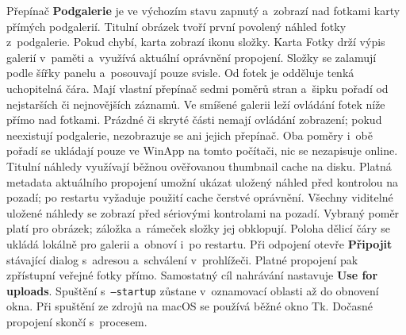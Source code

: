 \documentclass[11pt,a4paper]{article}
\newcommand{\ui}[1]{\textbf{#1}}
\begin{document}
Přepínač \ui{Podgalerie} je ve výchozím stavu zapnutý a~zobrazí nad fotkami
karty přímých podgalerií. Titulní obrázek tvoří první povolený náhled fotky
z~podgalerie. Pokud chybí, karta zobrazí ikonu složky. Karta Fotky drží výpis
galerií v~paměti a~využívá aktuální oprávnění propojení.
Složky se zalamují podle šířky panelu a~posouvají pouze svisle. Od fotek je
odděluje tenká uchopitelná čára. Mají vlastní přepínač sedmi poměrů stran a~šipku pořadí
od nejstarších či nejnovějších záznamů. Ve smíšené galerii leží ovládání fotek
níže přímo nad fotkami. Prázdné či skryté části nemají ovládání zobrazení;
pokud neexistují podgalerie, nezobrazuje se ani jejich přepínač. Oba poměry
i~obě pořadí se ukládají pouze ve WinApp na tomto počítači, nic se nezapisuje
online. Titulní náhledy využívají běžnou ověřovanou thumbnail cache na disku.
Platná metadata aktuálního propojení umožní ukázat uložený náhled před kontrolou
na pozadí; po restartu vyžaduje použití cache čerstvé oprávnění.
Všechny viditelné uložené náhledy se zobrazí před sériovými kontrolami na pozadí.
Vybraný poměr platí pro obrázek; záložka a~rámeček složky jej obklopují.
Poloha dělicí čáry se ukládá lokálně pro galerii a~obnoví i~po restartu.
Při odpojení otevře \ui{Připojit} stávající dialog s~adresou a~schválení
v~prohlížeči. Platné propojení pak zpřístupní veřejné fotky přímo.
Samostatný cíl nahrávání nastavuje \ui{Use for uploads}.
Spuštění s~\texttt{--startup} zůstane v~oznamovací oblasti až do obnovení
okna. Při spuštění ze zdrojů na macOS se používá běžné okno Tk.
Dočasné propojení skončí s~procesem.
\end{document}
